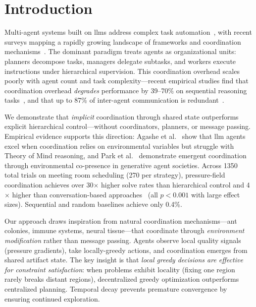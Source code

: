 
\section{Introduction}

Multi-agent systems built on \acp{llm} address complex task automation~\cite{wu2023autogen,hong2024metagpt,li2023camel}, with recent surveys mapping a rapidly growing landscape of frameworks and coordination mechanisms~\cite{guo2024llmmas_survey,tran2025collaboration}. The dominant paradigm treats agents as organizational units: planners decompose tasks, managers delegate subtasks, and workers execute instructions under hierarchical supervision. This coordination overhead scales poorly with agent count and task complexity---recent empirical studies find that coordination overhead \emph{degrades} performance by 39--70\% on sequential reasoning tasks~\cite{kim2025scaling}, and that up to 87\% of inter-agent communication is redundant~\cite{zhang2025agentprune}.

We demonstrate that \emph{implicit} coordination through shared state outperforms explicit hierarchical control---without coordinators, planners, or message passing. Empirical evidence supports this direction: Agashe et al.~\cite{agashe2025coordination} show that \ac{llm} agents excel when coordination relies on environmental variables but struggle with Theory of Mind reasoning, and Park et al.~\cite{park2023generative} demonstrate emergent coordination through environmental co-presence in generative agent societies. Across 1350 total trials on meeting room scheduling (270 per strategy), pressure-field coordination achieves over 30$\times$ higher solve rates than hierarchical control and 4$\times$ higher than conversation-based approaches~\cite{wu2023autogen} (all $p < 0.001$ with large effect sizes). Sequential and random baselines achieve only 0.4\%.

Our approach draws inspiration from natural coordination mechanisms---ant colonies, immune systems, neural tissue---that coordinate through \emph{environment modification} rather than message passing. Agents observe local quality signals (pressure gradients), take locally-greedy actions, and coordination emerges from shared artifact state. The key insight is that \emph{local greedy decisions are effective for constraint satisfaction}: when problems exhibit locality (fixing one region rarely breaks distant regions), decentralized greedy optimization outperforms centralized planning. Temporal decay prevents premature convergence by ensuring continued exploration.

